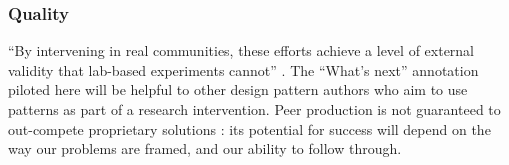 \vspace{-.25\baselineskip}

\subsubsection*{Quality} 
``By intervening in real communities, these efforts achieve a level of
external validity that lab-based experiments cannot''
\cite{benkler2015peer}.  The ``What's next'' annotation piloted here
will be helpful to other design pattern authors who aim to use
patterns as part of a research intervention.  Peer production is not guaranteed to
  out-compete proprietary solutions
\cite{benkler2015peer,free-software-better}: its potential for
success will depend on the way our problems are framed,
and our ability to follow through.









